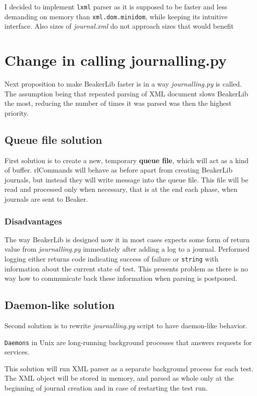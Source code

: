 I decided to implement \texttt{lxml} parser as it is supposed to be faster and less demanding on memory than \texttt{xml.dom.minidom}\cite{lxml_performance}, while keeping its intuitive interface. Also sizes of \textit{journal.xml} do not approach sizes that would benefit

\section{Change in calling journalling.py}
Next proposition to make BeakerLib faster is in a way \textit{journalling.py} is called. The assumption being that repeated parsing of XML document slows BeakerLib the most, reducing the number of times it was parsed was then the highest priority. 

\subsection{Queue file solution}  %
First solution is to create a new, temporary \textbf{queue file}, which will act as a kind of buffer. \mbox{rlCommands} will behave as before apart from creating BeakerLib journals, but instead they will write message into the queue file. This file will be read and processed only when necessary, that is at the end each phase, when journals are sent to Beaker.

\subsubsection{Disadvantages}
The way BeakerLib is designed now it in most cases expects some form of return value from \textit{journalling.py} immediately after adding a log to a journal. Performed logging either returns code indicating success of failure or \texttt{string} with information about the current state of test. This presents problem as there is no way how to communicate back these information when parsing is postponed. 

\subsection{Daemon-like solution}
Second solution is to rewrite \textit{journalling.py} script to have daemon-like behavior. 

\texttt{Daemons} in Unix are long-running background processes that answers requests for services\cite{daemon_explanation}.

This solution will run XML parser as a separate background process for each test. The XML object will be stored in memory, and parsed as whole only at the beginning of journal creation and in case of restarting the test run.  

